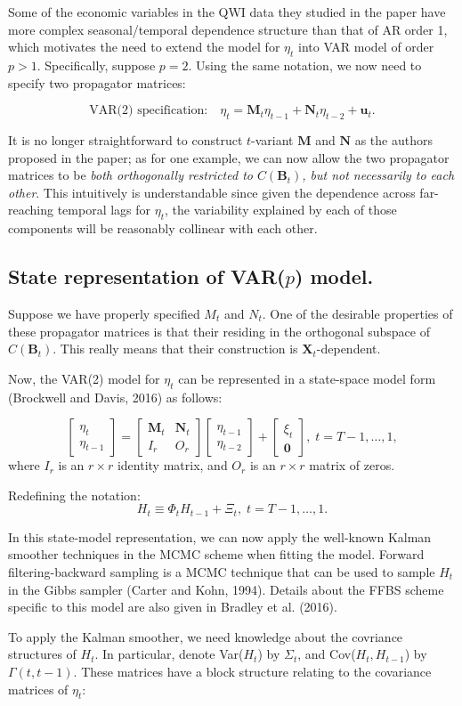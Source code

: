 \documentclass[12pt]{article}
\newcommand{\myvec}[2]{
\left[\begin{array}{c}
#1 \\ #2
\end{array}\right]
}
\newcommand{\mymat}[4]{
\left[\begin{array}{cc}
#1 & #2 \\ #3 & #4
\end{array}\right]
}
\begin{document}
Some of the economic variables in the QWI data they studied in the paper have more complex seasonal/temporal dependence structure than that of AR order 1, which motivates the need to extend the model for $\eta_t$ into VAR model of order $p>1$. Specifically, suppose $p=2$. Using the same notation, we now need to specify two propagator matrices:

$$\textrm{VAR(2) specification:}\quad \eta_t = \mathbf{M}_{t}\eta_{t-1} + \mathbf{N}_{t}\eta_{t-2} + \mathbf{u}_t.$$

It is no longer straightforward to construct $t$-variant $\mathbf{M}$ and $\mathbf{N}$ as the authors proposed in the paper; as for one example, we can now allow the two propagator matrices to be {\it both orthogonally restricted to $C(\mathbf{B}_t)$, but not necessarily to each other}. This intuitively is understandable since given the dependence across far-reaching temporal lags for $\eta_t$, the variability explained by each of those components will be reasonably collinear with each other.

\subsection*{State representation of VAR($p$) model.}
Suppose we have properly specified $M_t$ and $N_t$. One of the desirable properties of these propagator matrices is that their residing in the orthogonal subspace of $C(\mathbf{B}_t)$. This really means that their construction is $\mathbf{X}_t$-dependent. 

Now, the VAR(2) model for $\eta_t$ can be represented in a state-space model form (Brockwell and Davis, 2016) as follows:

$$\myvec{\eta_t}{\eta_{t-1}} =  \mymat{\mathbf{M}_t}{\mathbf{N}_t}{I_r}{O_r}\myvec{\eta_{t-1}}{\eta_{t-2}} + \myvec{\xi_t}{\mathbf{0}},\; t=T-1,\ldots, 1,$$
where $I_r$ is an $r\times r$ identity matrix, and $O_r$ is an $r\times r$ matrix of zeros.

Redefining the notation:
$$H_t \equiv \Phi_t H_{t-1} + \Xi_t,\; t=T-1,\ldots, 1.$$

In this state-model representation, we can now apply the well-known Kalman smoother techniques in the MCMC scheme when fitting the model. Forward filtering-backward sampling is a MCMC technique that can be used to sample $H_t$ in the Gibbs sampler (Carter and Kohn, 1994). Details about the FFBS scheme specific to this model are also given in Bradley et al. (2016).

To apply the Kalman smoother, we need knowledge about the covriance structures of $H_t$. In particular, denote Var($H_t$) by $\Sigma_t$, and Cov($H_t,H_{t-1}$) by $\Gamma(t,t-1)$. These matrices have a block structure relating to the covariance matrices of $\eta_t$:
\end{document}

